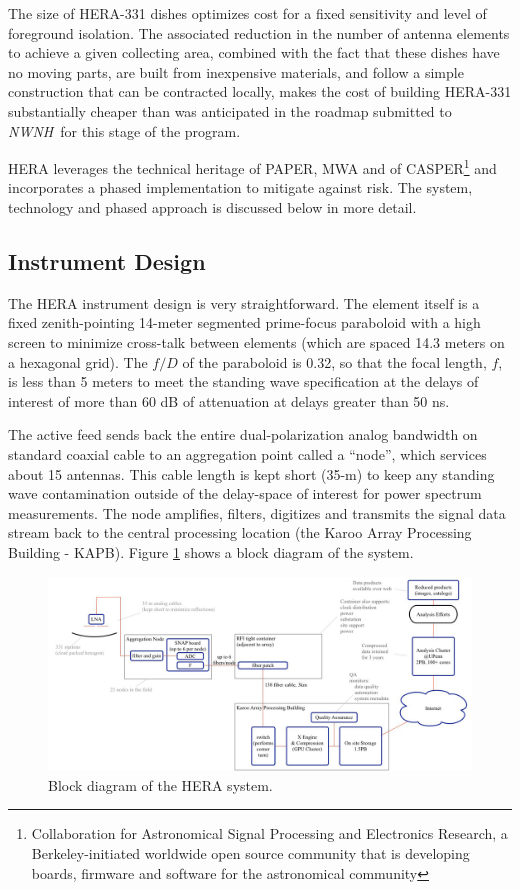 \documentclass[preprint]{aastex}
\def\nwnh{{\sl NWNH}}
\begin{document}
The size of HERA-331 dishes optimizes cost for a fixed sensitivity and
level of foreground isolation.  The associated reduction in the number
of antenna elements to achieve a given collecting area, combined with
the fact that these dishes have no moving parts, are built from
inexpensive materials, and follow a simple construction that can be
contracted locally, makes the cost of building HERA-331 substantially
cheaper than was anticipated in the roadmap submitted to \nwnh\ for this
stage of the program.   

HERA leverages the technical heritage of PAPER, MWA and of CASPER\footnote{Collaboration for Astronomical
Signal Processing and Electronics Research, a Berkeley-initiated worldwide open source community that is
developing boards, firmware and software for the astronomical community} and incorporates a
phased implementation to mitigate against risk.  The system, technology and phased approach is discussed below
in more detail.

\vspace{-0.25in}
\subsection{Instrument Design}
\vspace{-6pt}
\label{InstDes}
The HERA instrument design is very straightforward.  The element
itself is a fixed zenith-pointing 14-meter segmented prime-focus paraboloid with a high screen
to minimize cross-talk between elements (which are spaced 14.3 meters on a
hexagonal grid).   The $f/D$ of
the paraboloid is 0.32, so that the focal length, $f$, is less than 5 meters to meet the 
standing wave specification at the delays of interest of more than 60 dB of attenuation at delays 
greater than 50 ns.


The active feed sends back the entire dual-polarization analog bandwidth on standard
coaxial cable to an aggregation point called a ``node'', which services 
about 15 antennas.  This cable length is kept short (35-m) to keep any standing
wave contamination outside of the delay-space of interest for power spectrum
measurements.  The node amplifies, filters, digitizes and transmits the signal data stream
back to the central processing location (the Karoo Array Processing Building - KAPB).
Figure \ref{fig:blockDiagram} shows a block diagram of the system.

\begin{figure}[h]
\centering
\includegraphics[width=\textwidth]{plots/Engineering/HERA_high_level_block_diagram.jpg}
\caption{Block diagram of the HERA system.}
\label{fig:blockDiagram} 
\end{figure}
\end{document}

